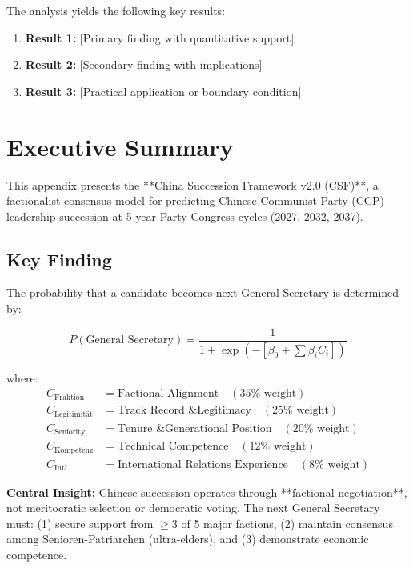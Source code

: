 \documentclass[11pt]{article}
\begin{document}
The analysis yields the following key results:

\begin{enumerate}
    \item \textbf{Result 1:} [Primary finding with quantitative support]
    \item \textbf{Result 2:} [Secondary finding with implications]
    \item \textbf{Result 3:} [Practical application or boundary condition]
\end{enumerate}


\section{Executive Summary}

This appendix presents the **China Succession Framework v2.0 (CSF)**, a factionalist-consensus model for predicting Chinese Communist Party (CCP) leadership succession at 5-year Party Congress cycles (2027, 2032, 2037).

\subsection{Key Finding}

The probability that a candidate becomes next General Secretary is determined by:

\begin{equation}
P(\text{General Secretary}) = \frac{1}{1 + \exp(-[\beta_0 + \sum \beta_i C_i])}
\end{equation}

where:
\begin{align*}
C_{\text{Fraktion}} &= \text{Factional Alignment} \quad (35\% \text{ weight}) \\
C_{\text{Legitimität}} &= \text{Track Record \& Legitimacy} \quad (25\% \text{ weight}) \\
C_{\text{Seniority}} &= \text{Tenure \& Generational Position} \quad (20\% \text{ weight}) \\
C_{\text{Kompetenz}} &= \text{Technical Competence} \quad (12\% \text{ weight}) \\
C_{\text{Intl}} &= \text{International Relations Experience} \quad (8\% \text{ weight})
\end{align*}

\textbf{Central Insight:} Chinese succession operates through **factional negotiation**, not meritocratic selection or democratic voting. The next General Secretary must: (1) secure support from $\geq 3$ of 5 major factions, (2) maintain consensus among Senioren-Patriarchen (ultra-elders), and (3) demonstrate economic competence.
\end{document}
